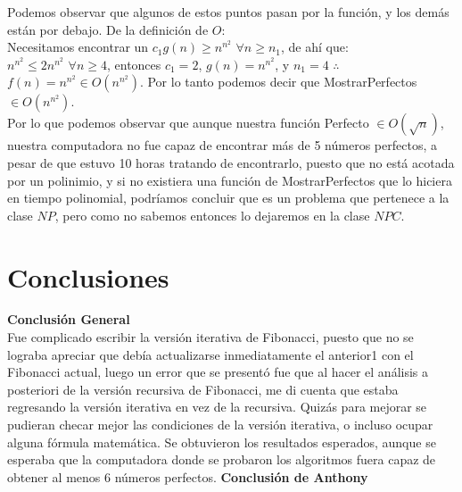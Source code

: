 \documentclass[12pt,twoside]{article}
\begin{document}
    \medskip
    Podemos observar que algunos de estos puntos pasan por la función, y los demás están por debajo. De la definición de $O$:
    \\ Necesitamos encontrar un $c_1g(n) \geq n^{n^2}$  $\forall n \geq n_1$, de ah\'i que:
    \\ $n^{n^2} \le 2n^{n^2} $ $\forall n \geq 4$, entonces $c_1 = 2$, $g(n)=n^{n^2}$, y $n_1=4$ $\therefore$ $f(n)=n^{n^2} \in O(n^{n^2})$. Por lo tanto podemos decir que MostrarPerfectos $\in O(n^{n^2})$.
\\ Por lo que podemos observar que aunque nuestra función Perfecto $\in O(\sqrt{n})$, nuestra computadora no fue capaz de encontrar más de 5 números perfectos, a pesar de que estuvo 10 horas tratando de encontrarlo, puesto que no está acotada por un polinimio, y si no existiera una función de MostrarPerfectos que lo hiciera en tiempo polinomial, podríamos concluir que es un problema que pertenece a la clase $NP$, pero como no sabemos entonces lo dejaremos en la clase $NPC$. 
\newpage
\section{Conclusiones}
\textbf{Conclusi\'on General}
\\Fue complicado escribir la versión iterativa de Fibonacci, puesto que no se lograba apreciar que debía actualizarse inmediatamente el anterior1 con el Fibonacci actual, luego un error que se presentó fue que al hacer el análisis a posteriori de la versión recursiva de Fibonacci, me di cuenta que estaba regresando la versión iterativa en vez de la recursiva. Quizás para mejorar se pudieran checar mejor las condiciones de la versión iterativa, o incluso ocupar alguna fórmula matemática. Se obtuvieron los resultados esperados, aunque se esperaba que la computadora donde se probaron los algoritmos fuera capaz de obtener al menos 6 números perfectos.
\newline
\newline
\textbf{Conclusi\'on de Anthony}
\end{document}
